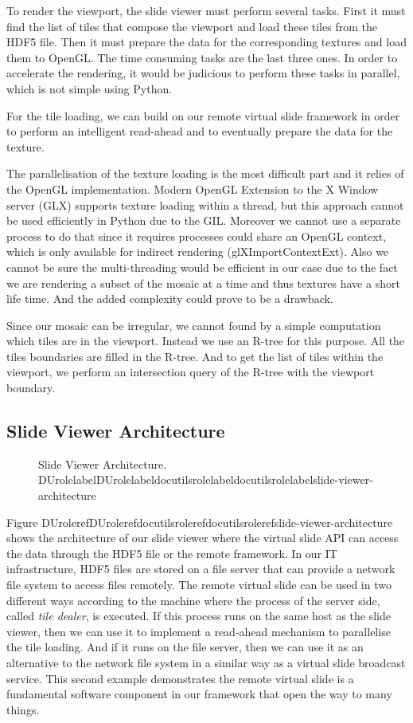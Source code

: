 \documentclass[letterpaper,compsoc,twoside]{IEEEtran}
\providecommand*{\DUrole}[2]{\ifcsname DUrole#1\endcsname \csname DUrole#1\endcsname{#2}\else \ifcsname docutilsrole#1\endcsname \csname docutilsrole#1\endcsname{#2}\else #2\fi \fi }
\begin{document}
To render the viewport, the slide viewer must perform several tasks. First it must find the list of
tiles that compose the viewport and load these tiles from the HDF5 file. Then it must prepare the
data for the corresponding textures and load them to OpenGL. The time consuming tasks are the last
three ones. In order to accelerate the rendering, it would be judicious to perform these tasks in
parallel, which is not simple using Python.

For the tile loading, we can build on our remote virtual slide framework in order to perform an
intelligent read-ahead and to eventually prepare the data for the texture.

The parallelisation of the texture loading is the most difficult part and it relies of the OpenGL
implementation. Modern OpenGL Extension to the X Window server (GLX) supports texture loading within
a thread, but this approach cannot be used efficiently in Python due to the GIL. Moreover we
cannot use a separate process to do that since it requires processes could share an OpenGL context,
which is only available for indirect rendering (glXImportContextExt). Also we cannot be sure the
multi-threading would be efficient in our case due to the fact we are rendering a subset of the
mosaic at a time and thus textures have a short life time. And the added complexity could prove to
be a drawback.

Since our mosaic can be irregular, we cannot found by a simple computation which tiles are in the
viewport. Instead we use an R-tree for this purpose. All the tiles boundaries are filled in the
R-tree. And to get the list of tiles within the viewport, we perform an intersection query of the
R-tree with the viewport boundary.

\subsection{Slide Viewer Architecture\label{slide-viewer-architecture}}
\begin{figure}[bht]\noindent{}
\caption{Slide Viewer Architecture. \DUrole{label}{slide-viewer-architecture}}
\end{figure}

Figure \DUrole{ref}{slide-viewer-architecture} shows the architecture of our slide viewer where the virtual
slide API can access the data through the HDF5 file or the remote framework. In our IT infrastructure, HDF5
files are stored on a file server that can provide a network file system to access files
remotely. The remote virtual slide can be used in two different ways according to the machine where
the process of the server side, called \emph{tile dealer}, is executed. If this process runs on the
same host as the slide viewer, then we can use it to implement a read-ahead mechanism to
parallelise the tile loading. And if it runs on the file server, then we can use it as an
alternative to the network file system in a similar way as a virtual slide broadcast service. This
second example demonstrates the remote virtual slide is a fundamental software component in our
framework that open the way to many things.
\end{document}
